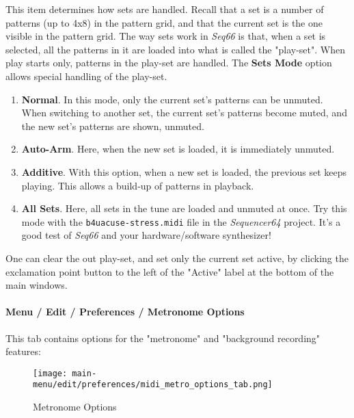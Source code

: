    This item determines how sets are handled.
   Recall that a set is a number of patterns (up to 4x8) in the pattern grid,
   and that the current set is the one visible in the pattern grid.
   The way sets work in \textsl{Seq66} is that, when a set is selected,
   all the patterns in it are loaded into what is called
   the "play-set".
   When play starts only, patterns in the play-set are handled.
   The \textbf{Sets Mode} option allows special handling of the play-set.

   \begin{enumerate}
      \item \textbf{Normal}.
         In this mode, only the current set's patterns can be unmuted.
         When switching to another set, the current set's patterns become
         muted, and the new set's patterns are shown, unmuted.
      \item \textbf{Auto-Arm}.
         Here, when the new set is loaded, it is immediately unmuted.
      \item \textbf{Additive}.
         With this option, when a new set is loaded, the previous set keeps
         playing. This allows a build-up of patterns in playback.
      \item \textbf{All Sets}.
         Here, all sets in the tune are loaded and unmuted at once.
         Try this mode with the \texttt{b4uacuse-stress.midi} file
         in the \textsl{Sequencer64} project.  It's a good test of
         \textsl{Seq66} and your hardware/software synthesizer!
   \end{enumerate}

   One can clear the out play-set, and set only the current set active, by
   clicking the exclamation point button to the left of the "Active" label at
   the bottom of the main windows.

\paragraph{Menu / Edit / Preferences / Metronome Options}
\label{paragraph:menu_edit_preferences_metronom_options}

   This tab contains options for the "metronome" and
   "background recording" features:

\begin{figure}[H]
   \centering 
   \texttt{[image: main-menu/edit/preferences/midi\_metro\_options\_tab.png]}
   \caption{Metronome Options}
   \label{fig:midi_metro_options_tab}
\end{figure}

